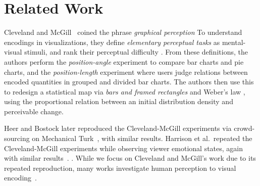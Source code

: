 \section{Related Work}

 Cleveland and McGill~\cite{cleveland_mcgill,cleveland1985graphical} coined the phrase \emph{graphical perception}  To understand encodings in visualizations, they define \emph{elementary perceptual tasks} as mental-visual stimuli, and rank their perceptual difficulty . From these definitions, the authors perform the \emph{position-angle} experiment to compare bar charts and pie charts, and the \emph{position-length} experiment where users judge relations between encoded quantities in grouped and divided bar charts. The authors then use this to redesign a statistical map via \emph{bars and framed rectangles} and Weber's law \cite{harrison2014_webers_law_rank}, using the proportional relation between an initial distribution density and perceivable change.

Heer and Bostock later reproduced the Cleveland-McGill experiments via crowd-sourcing on Mechanical Turk~\cite{HeerBostock2010}, with similar results. Harrison et al.~repeated the Cleveland-McGill experiments while observing viewer emotional states, again with similar results~\cite{harrison2013influencing}. . While we focus on Cleveland and McGill's work due to its repeated reproduction, many works investigate human perception to visual encoding~\cite{mackinlay1988applying,bertin1967semiologie,treisman1988feature,carpendale2003considering,wilkinson2006grammar,widgor_perception2007,munzner2015visualization}.

